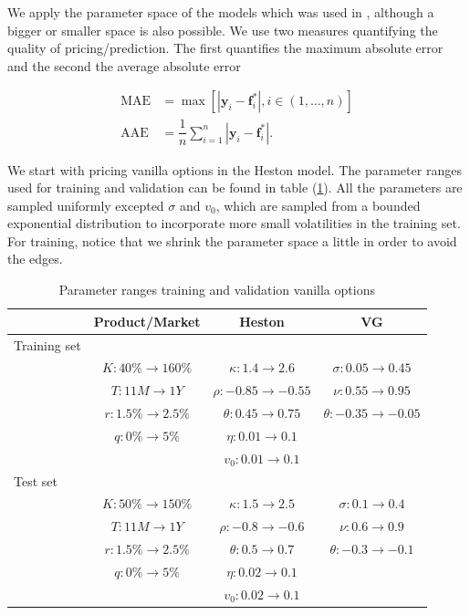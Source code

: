 \documentclass[12pt,a4paper,oneside]{book}
\begin{document}
We apply the parameter space of the models which was used in \cite{de2018machine}, although a bigger or smaller space is also possible. We use two measures quantifying the quality of pricing/prediction. The first quantifies the maximum absolute error and the second the average absolute error

\begin{align}
\text{MAE} &= \max \left[ |\bm{y}_i - \bm{f}^{\ast}_i |, i \in (1,\ldots, n) \right]  \\
\text{AAE} &= \dfrac{1}{n} \sum\nolimits_{i=1}^{n} | \bm{y}_i - \bm{f}^{\ast}_i | .
\end{align}

We start with pricing vanilla options in the Heston model. The parameter ranges used for training and validation can be found in table (\ref{table_vanilla's}). All the parameters are sampled uniformly excepted $\sigma$ and $v_0$, which are sampled from a bounded exponential distribution to incorporate more small volatilities in the training set. For training, notice that we shrink the parameter space a little in order to avoid the edges.

\begin{table}\centering 
\begin{tabular}[t]{lccc}\toprule
            &   Product/Market  &  Heston &  VG   \\ \midrule
            Training set &&& \\\addlinespace
 & $K: 40 \% \rightarrow 160\%$ & $\kappa: 1.4 \rightarrow 2.6$ &  $\sigma: 0.05 \rightarrow 0.45$ \\\addlinespace
			   & $T: 11M \rightarrow 1Y$      &  $\rho: -0.85 \rightarrow -0.55$   &  $\nu: 0.55 \rightarrow 0.95$     \\\addlinespace
			   & $r: 1.5\% \rightarrow 2.5\%  $   & $\theta: 0.45 \rightarrow 0.75$     &  $\theta:  -0.35 \rightarrow -0.05$     \\\addlinespace
			   & $q: 0 \%  \rightarrow 5 \%$    & $\eta: 0.01 \rightarrow 0.1$     &       \\\addlinespace
			   &      &  $v_0: 0.01 \rightarrow 0.1$   &       \\\addlinespace
			    Test set &&& \\\addlinespace
 & $K: 50 \% \rightarrow 150\%$ & $\kappa: 1.5 \rightarrow 2.5$ & $\sigma: 0.1 \rightarrow 0.4$  \\\addlinespace
			   & $T: 11M \rightarrow 1Y$      &  $\rho: -0.8 \rightarrow -0.6$   &  $\nu: 0.6 \rightarrow 0.9$     \\\addlinespace
			   & $r: 1.5\% \rightarrow 2.5\%  $   & $\theta: 0.5 \rightarrow 0.7$     &  $\theta:  -0.3 \rightarrow -0.1$    \\\addlinespace
			   & $q: 0 \%  \rightarrow 5 \%$    & $\eta: 0.02 \rightarrow 0.1$     &       \\\addlinespace
			   &      &  $v_0: 0.02 \rightarrow 0.1$   &       \\\bottomrule
\end{tabular}
\caption{Parameter ranges training and validation vanilla options}\label{table_vanilla's}
\end{table}
\end{document}
